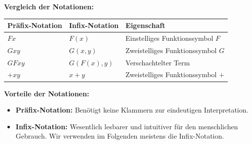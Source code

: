 \begin{math-stroke}
\end{math-stroke}

\begin{math-stroke}
\textbf{Vergleich der Notationen:}
\begin{center}
\begin{tabular}{lll}
\toprule
\textbf{Präfix-Notation} & \textbf{Infix-Notation} & \textbf{Eigenschaft} \\ \midrule
$F x$ & $F(x)$ & Einstelliges Funktionssymbol $F$ \\
$G x y$ & $G(x, y)$ & Zweistelliges Funktionssymbol $G$ \\
$G F x y$ & $G(F(x), y)$ & Verschachtelter Term \\
$+ x y$ & $x + y$ & Zweistelliges Funktionssymbol $+$ \\
\bottomrule
\end{tabular}
\end{center}

\par\vspace{1ex}\noindent
\textbf{Vorteile der Notationen:}
\begin{itemize}
    \item \textbf{Präfix-Notation:} Benötigt keine Klammern zur eindeutigen Interpretation.
    \item \textbf{Infix-Notation:} Wesentlich lesbarer und intuitiver für den menschlichen Gebrauch. Wir verwenden im Folgenden meistens die Infix-Notation.
\end{itemize}
\end{math-stroke}

\begin{ai-global-state-checkpoint-invisible-content}
\end{ai-global-state-checkpoint-invisible-content}

